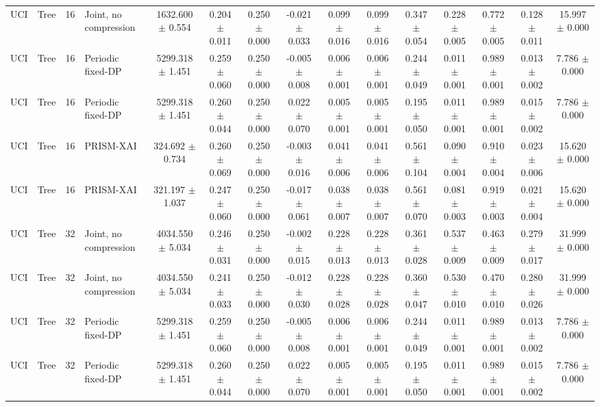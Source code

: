\begin{table}[t]
\begin{tabular}{llllccccccccccc}
UCI & Tree & 16 & Joint, no compression & 1632.600 $\pm$ 0.554 & 0.204 $\pm$ 0.011 & 0.250 $\pm$ 0.000 & -0.021 $\pm$ 0.033 & 0.099 $\pm$ 0.016 & 0.099 $\pm$ 0.016 & 0.347 $\pm$ 0.054 & 0.228 $\pm$ 0.005 & 0.772 $\pm$ 0.005 & 0.128 $\pm$ 0.011 & 15.997 $\pm$ 0.000 \\
UCI & Tree & 16 & Periodic fixed-DP & 5299.318 $\pm$ 1.451 & 0.259 $\pm$ 0.060 & 0.250 $\pm$ 0.000 & -0.005 $\pm$ 0.008 & 0.006 $\pm$ 0.001 & 0.006 $\pm$ 0.001 & 0.244 $\pm$ 0.049 & 0.011 $\pm$ 0.001 & 0.989 $\pm$ 0.001 & 0.013 $\pm$ 0.002 & 7.786 $\pm$ 0.000 \\
UCI & Tree & 16 & Periodic fixed-DP & 5299.318 $\pm$ 1.451 & 0.260 $\pm$ 0.044 & 0.250 $\pm$ 0.000 & 0.022 $\pm$ 0.070 & 0.005 $\pm$ 0.001 & 0.005 $\pm$ 0.001 & 0.195 $\pm$ 0.050 & 0.011 $\pm$ 0.001 & 0.989 $\pm$ 0.001 & 0.015 $\pm$ 0.002 & 7.786 $\pm$ 0.000 \\
UCI & Tree & 16 & PRISM-XAI & 324.692 $\pm$ 0.734 & 0.260 $\pm$ 0.069 & 0.250 $\pm$ 0.000 & -0.003 $\pm$ 0.016 & 0.041 $\pm$ 0.006 & 0.041 $\pm$ 0.006 & 0.561 $\pm$ 0.104 & 0.090 $\pm$ 0.004 & 0.910 $\pm$ 0.004 & 0.023 $\pm$ 0.006 & 15.620 $\pm$ 0.000 \\
UCI & Tree & 16 & PRISM-XAI & 321.197 $\pm$ 1.037 & 0.247 $\pm$ 0.060 & 0.250 $\pm$ 0.000 & -0.017 $\pm$ 0.061 & 0.038 $\pm$ 0.007 & 0.038 $\pm$ 0.007 & 0.561 $\pm$ 0.070 & 0.081 $\pm$ 0.003 & 0.919 $\pm$ 0.003 & 0.021 $\pm$ 0.004 & 15.620 $\pm$ 0.000 \\
UCI & Tree & 32 & Joint, no compression & 4034.550 $\pm$ 5.034 & 0.246 $\pm$ 0.031 & 0.250 $\pm$ 0.000 & -0.002 $\pm$ 0.015 & 0.228 $\pm$ 0.013 & 0.228 $\pm$ 0.013 & 0.361 $\pm$ 0.028 & 0.537 $\pm$ 0.009 & 0.463 $\pm$ 0.009 & 0.279 $\pm$ 0.017 & 31.999 $\pm$ 0.000 \\
UCI & Tree & 32 & Joint, no compression & 4034.550 $\pm$ 5.034 & 0.241 $\pm$ 0.033 & 0.250 $\pm$ 0.000 & -0.012 $\pm$ 0.030 & 0.228 $\pm$ 0.028 & 0.228 $\pm$ 0.028 & 0.360 $\pm$ 0.047 & 0.530 $\pm$ 0.010 & 0.470 $\pm$ 0.010 & 0.280 $\pm$ 0.026 & 31.999 $\pm$ 0.000 \\
UCI & Tree & 32 & Periodic fixed-DP & 5299.318 $\pm$ 1.451 & 0.259 $\pm$ 0.060 & 0.250 $\pm$ 0.000 & -0.005 $\pm$ 0.008 & 0.006 $\pm$ 0.001 & 0.006 $\pm$ 0.001 & 0.244 $\pm$ 0.049 & 0.011 $\pm$ 0.001 & 0.989 $\pm$ 0.001 & 0.013 $\pm$ 0.002 & 7.786 $\pm$ 0.000 \\
UCI & Tree & 32 & Periodic fixed-DP & 5299.318 $\pm$ 1.451 & 0.260 $\pm$ 0.044 & 0.250 $\pm$ 0.000 & 0.022 $\pm$ 0.070 & 0.005 $\pm$ 0.001 & 0.005 $\pm$ 0.001 & 0.195 $\pm$ 0.050 & 0.011 $\pm$ 0.001 & 0.989 $\pm$ 0.001 & 0.015 $\pm$ 0.002 & 7.786 $\pm$ 0.000 \\

\end{tabular}
\end{table}
